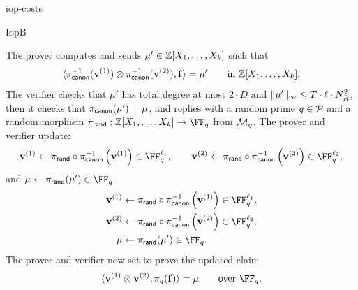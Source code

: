 \begin{lncsappendix}{iop-costs}
\begin{lncsmove}{IopB}
\begin{construction}
\begin{enumerate}[leftmargin=*]
The prover computes and sends $\mu' \in \mathbb{Z}[X_1, \ldots, X_{k}]$ such that
%
$$
\langle \pi_{\mathsf{canon}}^{-1}(\mathbf{v}^{(1)}) \otimes \pi_{\mathsf{canon}}^{-1}(\mathbf{v}^{(2)}) , \mathbf{f} \rangle = \mu' \qquad \text{in } \mathbb{Z}[X_1, \ldots, X_{k}].
$$
%
The verifier checks that $\mu'$ has total degree at most $2\cdot D$ and $\lVert \mu'\rVert_\infty \leq T\cdot \ell\cdot N_R^2$, then it checks that $\pi_{\mathsf{canon}}(\mu')=\mu$, and replies with a random prime $q\in \mathcal{P}$ and a random morphism
%
$
\pirand : \ZZ[X_1, \ldots, X_{k}] \to \FF_q
$ from $\mathcal{M}_q$.
 The prover and verifier update:
 \iflncs
 $$
 \vv^{(1)}{} \gets \pirand\circ \picanon^{-1}\left(\vv^{(1)}\right)\in \FF_{q}^{\codedim_1},\qquad
\vv^{(2)}{} \gets \pirand\circ \picanon^{-1}\left(\vv^{(2)}\right)\in \FF_{q}^{\codedim_2},
$$
and $\mu\gets \pirand(\mu')\in \FF_q.$
 \else
\begin{align*}
\vv^{(1)}{} &\gets \pirand\circ \picanon^{-1}\left(\vv^{(1)}\right)\in \FF_{q}^{\codedim_1},\\
\vv^{(2)}{} &\gets \pirand\circ \picanon^{-1}\left(\vv^{(2)}\right)\in \FF_{q}^{\codedim_2},\\
\mu&\gets \pirand(\mu')\in \FF_q.
\end{align*}
\fi
The prover and verifier now set to prove the updated claim 
%
\begin{equation}\label{e:core_bitz_eq_new_0}
\langle \vv^{(1)} \otimes \vv^{(2)}, \pi_q(\bff)\rangle = \mu \qquad \text{over } \FF_q.
\end{equation}



\end{enumerate}
\end{construction}
\end{lncsmove}
\end{lncsappendix}
